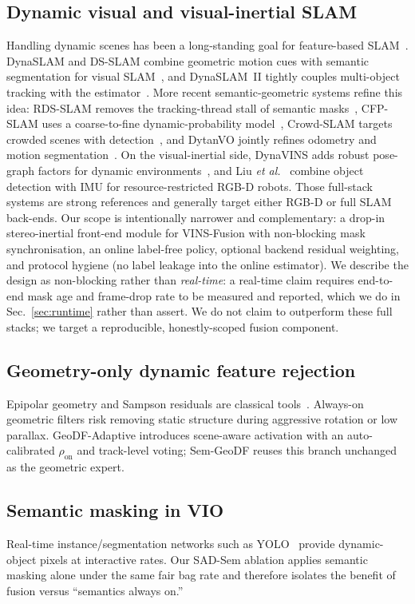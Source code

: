 \documentclass{ieeeaccess}
\begin{document}
\subsection{Dynamic visual and visual-inertial SLAM}
Handling dynamic scenes has been a long-standing goal for feature-based SLAM~\cite{cadena2016survey}.
DynaSLAM and DS-SLAM combine geometric motion cues with semantic segmentation for visual SLAM~\cite{bescos2018dynaslam,yu2018dsslam}, and DynaSLAM~II tightly couples multi-object tracking with the estimator~\cite{bescos2021dynaslam2}.
More recent semantic-geometric systems refine this idea: RDS-SLAM removes the tracking-thread stall of semantic masks~\cite{zhang2020rdsslam}, CFP-SLAM uses a coarse-to-fine dynamic-probability model~\cite{hu2023cfpslam}, Crowd-SLAM targets crowded scenes with detection~\cite{soares2021crowd}, and DytanVO jointly refines odometry and motion segmentation~\cite{shen2023dytanvo}.
On the visual-inertial side, DynaVINS adds robust pose-graph factors for dynamic environments~\cite{song2022dynavins}, and Liu \emph{et al.}~\cite{liu2022dynamicvins} combine object detection with IMU for resource-restricted RGB-D robots.
Those full-stack systems are strong references and generally target either RGB-D or full SLAM back-ends.
Our scope is intentionally narrower and complementary: a drop-in stereo-inertial front-end module for VINS-Fusion with non-blocking mask synchronisation, an online label-free policy, optional backend residual weighting, and protocol hygiene (no label leakage into the online estimator). We describe the design as non-blocking rather than \emph{real-time}: a real-time claim requires end-to-end mask age and frame-drop rate to be measured and reported, which we do in Sec.~\ref{sec:runtime} rather than assert.
We do not claim to outperform these full stacks; we target a reproducible, honestly-scoped fusion component.

\subsection{Geometry-only dynamic feature rejection}
Epipolar geometry and Sampson residuals are classical tools~\cite{hartley2003multiple}.
Always-on geometric filters risk removing static structure during aggressive rotation or low parallax.
GeoDF-Adaptive introduces scene-aware activation with an auto-calibrated \(\rho_{\mathrm{on}}\) and track-level voting; Sem-GeoDF reuses this branch unchanged as the geometric expert.

\subsection{Semantic masking in VIO}
Real-time instance/segmentation networks such as YOLO~\cite{redmon2016yolo,jocher2023yolo} provide dynamic-object pixels at interactive rates.
Our SAD-Sem ablation applies semantic masking alone under the same fair bag rate and therefore isolates the benefit of fusion versus ``semantics always on.''
\end{document}
